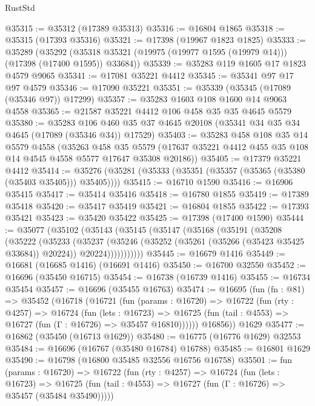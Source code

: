 \begin{lexlean}{RustStd}
\begin{coremodule}
@35315 := @35312 (@17389 @35313)
@35316 := @16804 @1865
@35318 := @35315 (@17393 @35316)
@35321 := @17398 (@19967 @1823 @1825)
@35333 := @35289
    (@35292 (@35318 @35321 (@19975 (@19977 @1595 (@19979 @14))) (@17398 (@17400 @1595)) @33684))
@35339 := @35283 @119 @1605 @17 @1823 @4579 @9065
@35341 := @17081 @35221 @4412
@35345 := @35341 @97 @17 @97 @4579
@35346 := @17090 @35221
@35351 := @35339 (@35345 (@17089 (@35346 @97)) @17299)
@35357 := @35283 @1603 @108 @1600 @14 @9063 @4558
@35365 := @21587 @35221 @4412 @106 @458 @35 @35 @4645 @5579
@35380 := @35283
    @106
    @460
    @35
    @37
    @4645
    @20108
    (@35341 @34 @35 @34 @4645 (@17089 (@35346 @34)) @17529)
@35403 := @35283
    @458
    @108
    @35
    @14
    @5579
    @4558
    (@35263
      @458
      @35
      @5579
      (@17637 @35221 @4412 @455 @35 @108 @14 @4545 @4558 @5577 @17647 @35308 @20186))
@35405 := @17379 @35221 @4412
@35414 := @35276 (@35281 (@35333 (@35351 (@35357 (@35365 (@35380 (@35403 @35405))) @35405))))
@35415 := @16710 @1590
@35416 := @16906 @35415
@35417 := @35414 @35416
@35418 := @16780 @1855
@35419 := @17389 @35418
@35420 := @35417 @35419
@35421 := @16804 @1855
@35422 := @17393 @35421
@35423 := @35420 @35422
@35425 := @17398 (@17400 @1590)
@35444 := @35077
    (@35102
      (@35143
        (@35145
          (@35147
            (@35168
              (@35191
                (@35208
                  (@35222
                    (@35233
                      (@35237
                        (@35246
                          (@35252 (@35261 (@35266 (@35423 @35425 @33684)) @20224))
                          @20224)))))))))))
@35445 := @16679 @1416
@35449 := @16681 (@16685 @1416) (@16691 @1416)
@35450 := @16700 @32550
@35452 := @16696 (@35450 @16715)
@35454 := @16738 (@16739 @1416)
@35455 := @16734 @35454
@35457 := @16696 (@35455 @16763)
@35474 := @16695
    (fun (fn : @81) =>
    @35452
      (@16718
        (@16721
          (fun (params : @16720) =>
          @16722
            (fun (rty : @4257) =>
            @16724
              (fun (lets : @16723) =>
              @16725 (fun (tail : @4553) => @16727 (fun (Γ : @16726) => @35457 @16810))))))
        @16856))
    @1629
@35477 := @16862 (@35450 (@16713 @1629))
@35480 := @16775 (@16776 @1629) @32553
@35484 := @16696 (@16767 (@35480 @16784) @16788)
@35485 := @16801 @1629
@35490 := @16798 (@16800 @35485 @32556 @16756 @16758)
@35501 := fun (params : @16720) =>
  @16722
    (fun (rty : @4257) =>
    @16724
      (fun (lets : @16723) =>
      @16725 (fun (tail : @4553) => @16727 (fun (Γ : @16726) => @35457 (@35484 @35490)))))

\end{coremodule}
\end{lexlean}
